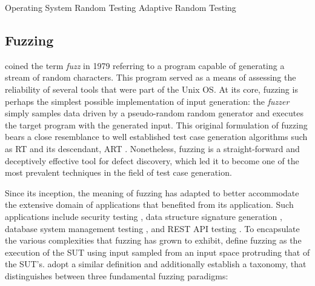  {Operating System}
 {Random Testing}
 {Adaptive Random Testing}

\subsection{Fuzzing}

\citet{miller1990empirical} coined the term \textit{fuzz} in 1979 referring
to a program capable of generating a stream of random characters.
This program served as a means of assessing
the reliability of several tools that were part of the Unix \Gls{OS}.
At its core, fuzzing is perhaps the simplest possible implementation
of input generation: the \textit{fuzzer} simply samples data
driven by a pseudo-random random generator and executes
the target program with the generated input.
This original formulation of fuzzing bears a close
resemblance to well established test case generation algorithms
such as \Gls{RT} \cite{duran1981report} and 
its descendant, \Gls{ART} \cite{chen2010adaptive}.
Nonetheless, fuzzing is a straight-forward and deceptively effective 
tool for defect discovery, which led it to become one
of the most prevalent techniques in the field of test case generation.

Since its inception, the meaning of fuzzing has adapted to
better accommodate the extensive domain of applications that
benefited from its application.
Such applications include security testing \cite{oehlert2005violating, stephens2016driller},
data structure signature generation \cite{dolan2009robust}, 
database system management testing \cite{zhong2020squirrel},
and REST API testing \cite{atlidakis2019restler, godefroid2020intelligent}.
To encapsulate the various complexities that fuzzing has grown
to exhibit, \citet{manes2019art} define fuzzing as the execution
of the \gls{SUT} using input sampled from an input space protruding
that of the \gls{SUT}'s.
\citet{saavedra2019review} adopt a similar definition and additionally
establish a taxonomy, that distinguishes between three 
fundamental fuzzing paradigms:

